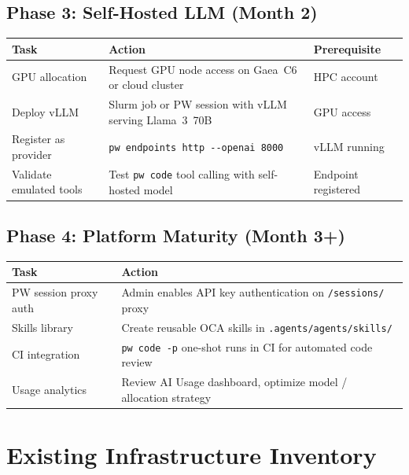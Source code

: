\documentclass[11pt,letterpaper,twoside]{article}
\begin{document}
\subsection*{Phase 3: Self-Hosted LLM (Month 2)}

\begin{table}[H]
\centering\small
\begin{tabularx}{\textwidth}{L{4.0cm} X L{3.5cm}}
\toprule
\textbf{Task} & \textbf{Action} & \textbf{Prerequisite} \\
\midrule
GPU allocation & Request GPU node access on Gaea~C6 or cloud cluster & HPC account \\
Deploy vLLM & Slurm job or PW session with vLLM serving Llama~3~70B & GPU access \\
Register as provider & \texttt{pw endpoints http -{}-openai 8000} & vLLM running \\
Validate emulated tools & Test \texttt{pw code} tool calling with self-hosted model & Endpoint registered \\
\bottomrule
\end{tabularx}
\end{table}

\subsection*{Phase 4: Platform Maturity (Month 3+)}

\begin{table}[H]
\centering\small
\begin{tabularx}{\textwidth}{L{4.0cm} X}
\toprule
\textbf{Task} & \textbf{Action} \\
\midrule
PW session proxy auth & Admin enables API key authentication on \texttt{/sessions/} proxy \\
Skills library & Create reusable OCA skills in \texttt{.agents/agents/skills/} \\
CI integration & \texttt{pw code -p} one-shot runs in CI for automated code review \\
Usage analytics & Review AI Usage dashboard, optimize model / allocation strategy \\
\bottomrule
\end{tabularx}
\end{table}

\section{Existing Infrastructure Inventory}
\label{sec:inventory}
\end{document}
